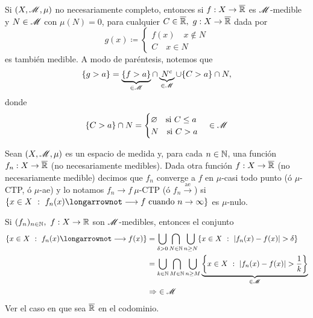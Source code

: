 
\begin{remark}
	Si $(X, \mathscr{M}, \mu)$ no necesariamente completo, entonces si $f : X \to \overline{\mathbb{R}}$ es $\mathscr{M}$-medible y $N \in \mathscr{M}$ con $\mu(N) = 0$, para cualquier $C \in \overline{\mathbb{R}},\ g : X \to \overline{\mathbb{R}}$ dada por 
	\[ g(x) \coloneq \begin{cases}
		f(x) \quad x \not\in N \\
		C \quad x \in N
	\end{cases} \]
	es también medible. A modo de paréntesis, notemos que
	\[ \{g > a\} = \underbrace{\{f > a\}}_{\in \mathscr{M}} \cap \underbrace{N^c}_{\in\mathscr{M}} \cup \{C > a\} \cap N, \]
	donde
	\[ \{C > a\} \cap N = \begin{cases}
		\varnothing \quad \text{si } C \leq a \\
		N \quad \text{si } C > a
	\end{cases} \in \mathscr{M} \]
\end{remark}

\begin{definition}
	Sean $(X, \mathscr{M}, \mu)$ es un espacio de medida y, para cada $n\in\mathbb{N}$, una función $f_n : X \to \overline{\mathbb{R}}$ (no necesariamente medibles). Dada otra función $f : X \to \overline{\mathbb{R}}$ (no necesariamente medible) decimos que $f_n$ converge a $f$ en $\mu$-casi todo punto (ó $\mu$-CTP, ó $\mu$-ae) y lo notamos $f_n \rightarrow f \ \mu$-CTP (ó $f_n \stackrel{\text{ae}}{\longrightarrow}$) si $\{x \in X \ : \ f_n(x) \longarrownot\longrightarrow f \text{ cuando } n \to \infty \}$ es $\mu$-nulo.
\end{definition}

\begin{remark}
	Si $(f_n)_{n\in\mathbb{N}},\ f : X \to \mathbb{R}$ son $\mathscr{M}$-medibles, entonces el conjunto
	\begin{align*}
		\{x \in X \ : \ f_n(x) \longarrownot\longrightarrow f(x)\} &= \bigcup_{\delta > 0} \bigcap_{N \in \N} \bigcup_{n \geq N} \{x \in X \ : \ | f_n(x) - f(x) | > \delta\} \\
		&= \bigcup_{k \in \N} \bigcap_{M \in \N} \bigcup_{n \geq M} \underbrace{\left\{x \in X \ : \ | f_n(x) - f(x) | > \frac{1}{k}\right\}}_{\in\mscr{M}} \\
		&\implies \ \in \mscr{M}
	\end{align*}
	Ver el caso en que sea $\overline{\mathbb{R}}$ en el codominio.
\end{remark}

